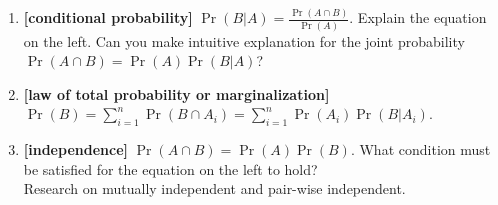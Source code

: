 \documentclass[a4paper]{article}
\begin{document}
\begin{enumerate}
\item
\textbf{[conditional probability]}
$\operatorname { Pr } ( B | A ) = \frac { \operatorname { Pr } ( A \cap B ) } { \operatorname { Pr } ( A ) }$. Explain the equation on the left. 
Can you make intuitive explanation for the joint probability $\operatorname { Pr } ( A \cap B ) = \operatorname { Pr } ( A ) \operatorname { Pr } ( B | A )$?

\item
\textbf{[law of total probability or marginalization]}
$\operatorname { Pr } ( B ) = \sum _ { i = 1 } ^ { n } \operatorname { Pr } \left( B \cap A _ { i } \right) = \sum _ { i = 1 } ^ { n } \operatorname { Pr } \left( A _ { i } \right) \operatorname { Pr } ( B | A _ { i } )$.

\item
\textbf{[independence]}
$\operatorname { Pr } ( A \cap B ) = \operatorname { Pr } ( A ) \operatorname { Pr } ( B )$. What condition must be satisfied for the equation on the left to hold?\\
Research on mutually independent and pair-wise independent.

\end{enumerate}
\end{document}
